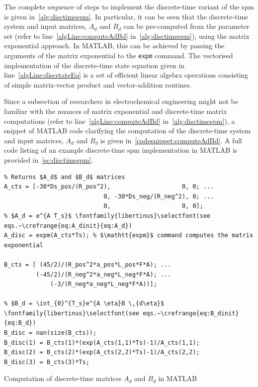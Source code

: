 The complete  sequence of steps  to implement  the discrete-time variant  of the
\gls{spm}  is given  in~\cref{alg:disctimespm}. In  particular, it  can be  seen
that  the discrete-time  system  and  input matrices,  $A_d$  and  $B_d$ can  be
pre-computed  from the  parameter set  (refer to  line~\ref{algLine:computeAdBd}
in~\cref{alg:disctimespm}), using  the matrix  exponential approach.  In MATLAB,
this  can be  achieved by  passing the  arguments of  the matrix  exponential to
the  \verb+expm+ command.  The  vectorised implementation  of the  discrete-time
state equation  given in  line~\ref{algLine:discstateEq} is  a set  of efficient
linear  algebra  operations  consisting  of  simple  matrix-vector  product  and
vector-addition routines.



Since   a    subsection   of   researchers   in    electrochemical   engineering
might   not  be   familiar  with   the   nuances  of   matrix  exponential   and
discrete-time  matrix  computations   (refer  to  line~\ref{algLine:computeAdBd}
in~\cref{alg:disctimespm}),   a   snippet   of  MATLAB   code   clarifying   the
computation  of  the   discrete-time  system  and  input   matrices,  $A_d$  and
$B_d$  is  given  in~\cref{codesnippet:computeAdBd}.  A  full  code  listing  of
an  example  discrete-time  \gls{spm}   implementation  in  MATLAB  is  provided
in~\cref{sc:disctimespm}.

\begin{listing}
\begin{verbatim}
% Returns $A_d$ and $B_d$ matrices
A_cts = [-30*Ds_pos/(R_pos^2),                    0, 0; ...
                            0, -30*Ds_neg/(R_neg^2), 0; ...
                            0,                    0, 0];
% $A_d = e^{A T_s}$ \fontfamily{libertinus}\selectfont(see eqs.~\crefrange{eq:A_dinit}{eq:A_d})
A_disc = expm(A_cts*Ts); % $\mathtt{expm}$ command computes the matrix exponential

B_cts = [ (45/2)/(R_pos^2*a_pos*L_pos*F*A); ...
         (-45/2)/(R_neg^2*a_neg*L_neg*F*A); ...
             (-3/(R_neg*a_neg*L_neg*F*A))];

% $B_d = \int_{0}^{T_s}e^{A \eta}B \,{d\eta}$ \fontfamily{libertinus}\selectfont(see eqs.~\crefrange{eq:B_dinit}{eq:B_d})
B_disc = nan(size(B_cts));
B_disc(1) = B_cts(1)*(exp(A_cts(1,1)*Ts)-1)/A_cts(1,1);
B_disc(2) = B_cts(2)*(exp(A_cts(2,2)*Ts)-1)/A_cts(2,2);
B_disc(3) = B_cts(3)*Ts;

\end{verbatim}
\caption{Computation of discrete-time matrices $A_d$ and $B_d$ in MATLAB}
\label{codesnippet:computeAdBd}
\end{listing}

